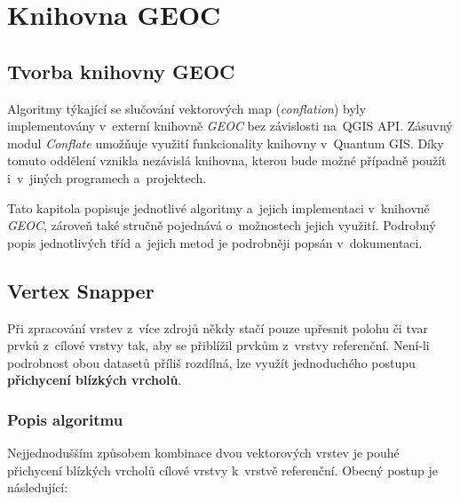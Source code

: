 \chapter{Knihovna GEOC}
\label{5-geoc}

\section{Tvorba knihovny GEOC}
\label{knihovna}

Algoritmy týkající se slučování vektorových map (\textit{conflation}) byly
implementovány v~externí knihovně \textit{GEOC} bez závislosti na~QGIS API. 
Zásuvný modul \textit{Conflate} umožňuje využití funkcionality knihovny 
v~Quantum GIS. Díky tomuto oddělení vznikla nezávislá knihovna, kterou bude
možné případně použít i~v~jiných programech a~projektech.

Tato kapitola popisuje jednotlivé algoritmy a~jejich implementaci v~knihovně
\textit{GEOC}, zároveň také stručně pojednává o~možnostech  jejich využití.
Podrobný popis jednotlivých tříd a~jejich metod je podrobněji popsán v~dokumentaci. %


\section{Vertex Snapper} 
\label{vertexsnapper}

Při zpracování vrstev z~více zdrojů někdy stačí pouze upřesnit polohu či tvar 
prvků z~cílové vrstvy tak, aby se přiblížil prvkům z~vrstvy referenční. 
\mbox{Není-li} podrobnost obou datasetů příliš rozdílná, lze využít jednoduchého 
postupu \textbf{přichycení blízkých vrcholů}.

\subsection{Popis algoritmu}
\label{vs-algoritmus}

Nejjednodušším způsobem kombinace dvou vektorových vrstev je pouhé přichycení 
blízkých vrcholů cílové vrstvy k~vrstvě referenční. Obecný postup je následující:

